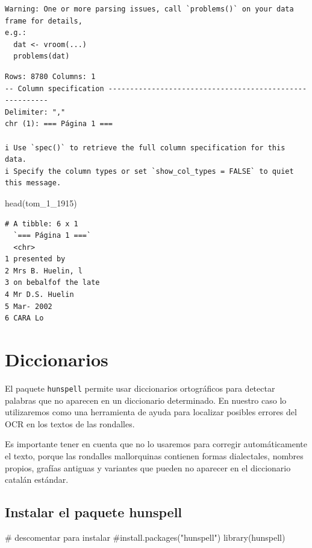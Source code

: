 \documentclass[
  letterpaper,
  DIV=11,
  numbers=noendperiod]{scrreprt}
\newenvironment{Shaded}{\begin{snugshade}}{\end{snugshade}}
\newcommand{\CommentTok}[1]{\textcolor[rgb]{0.37,0.37,0.37}{#1}}
\newcommand{\FunctionTok}[1]{\textcolor[rgb]{0.28,0.35,0.67}{#1}}
\newcommand{\NormalTok}[1]{\textcolor[rgb]{0.00,0.23,0.31}{#1}}
\begin{document}
\begin{verbatim}
Warning: One or more parsing issues, call `problems()` on your data frame for details,
e.g.:
  dat <- vroom(...)
  problems(dat)
\end{verbatim}

\begin{verbatim}
Rows: 8780 Columns: 1
-- Column specification --------------------------------------------------------
Delimiter: ","
chr (1): === Página 1 ===

i Use `spec()` to retrieve the full column specification for this data.
i Specify the column types or set `show_col_types = FALSE` to quiet this message.
\end{verbatim}

\begin{Shaded}
\begin{Highlighting}[]
\FunctionTok{head}\NormalTok{(tom\_1\_1915)}
\end{Highlighting}
\end{Shaded}

\begin{verbatim}
# A tibble: 6 x 1
  `=== Página 1 ===`  
  <chr>               
1 presented by        
2 Mrs B. Huelin, l    
3 on bebalfof the late
4 Mr D.S. Huelin      
5 Mar- 2002           
6 CARA Lo             
\end{verbatim}

\section{Diccionarios}\label{diccionarios}

El paquete \texttt{hunspell} permite usar diccionarios ortográficos para
detectar palabras que no aparecen en un diccionario determinado. En
nuestro caso lo utilizaremos como una herramienta de ayuda para
localizar posibles errores del OCR en los textos de las rondalles.

Es importante tener en cuenta que no lo usaremos para corregir
automáticamente el texto, porque las rondalles mallorquinas contienen
formas dialectales, nombres propios, grafías antiguas y variantes que
pueden no aparecer en el diccionario catalán estándar.

\subsection{Instalar el paquete
hunspell}\label{instalar-el-paquete-hunspell}

\begin{Shaded}
\begin{Highlighting}[]
\CommentTok{\# descomentar para instalar}
\CommentTok{\#install.packages("hunspell")}
\FunctionTok{library}\NormalTok{(hunspell)}
\end{Highlighting}
\end{Shaded}
\end{document}
